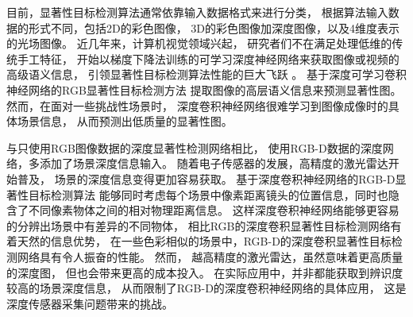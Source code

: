 



目前，显著性目标检测算法通常依靠输入数据格式来进行分类，
根据算法输入数据的形式不同，包括2D的彩色图像，
3D的彩色图像加深度图像，以及4维度表示的光场图像。
近几年来，计算机视觉领域兴起，
研究者们不在满足处理低维的传统手工特征，
开始以梯度下降法训练的可学习深度神经网络来获取图像或视频的高级语义信息，
引领显著性目标检测算法性能的巨大飞跃
。
基于深度可学习卷积神经网络的RGB显著性目标检测方法
提取图像的高层语义信息来预测显著性图。
然而，在面对一些挑战性场景时，
深度卷积神经网络很难学习到图像成像时的具体场景信息，
从而预测出低质量的显著性图。



与只使用RGB图像数据的深度显著性检测网络相比，
使用RGB-D数据的深度网络，多添加了场景深度信息输入。
随着电子传感器的发展，高精度的激光雷达开始普及，
场景的深度信息变得更加容易获取。
基于深度卷积神经网络的RGB-D显著性目标检测算法
能够同时考虑每个场景中像素距离镜头的位置信息，同时也隐含了不同像素物体之间的相对物理距离信息。
这样深度卷积神经网络能够更容易的分辨出场景中有差异的不同物体，
相比RGB的深度卷积显著性目标检测网络有着天然的信息优势，
在一些色彩相似的场景中，RGB-D的深度卷积显著性目标检测网络具有令人振奋的性能。
然而，
越高精度的激光雷达，虽然意味着更高质量的深度图，
但也会带来更高的成本投入。
在实际应用中，并非都能获取到辨识度较高的场景深度信息，
从而限制了RGB-D的深度卷积神经网络的具体应用，
这是深度传感器采集问题带来的挑战。





